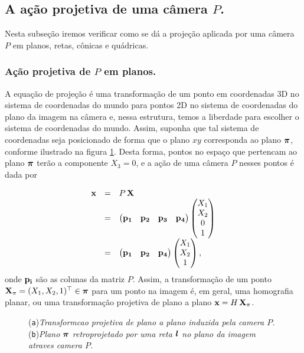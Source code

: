 \subsection{A ação projetiva de uma câmera $P$.}
Nesta subseção iremos verificar como se dá a projeção aplicada por uma câmera $P$ em planos, retas, cônicas e quádricas.


\subsubsection{Ação projetiva de $P$ em planos.}
A equação de projeção é uma transformação de um ponto em coordenadas 3D no sistema de coordenadas do mundo para pontos 2D no sistema de coordenadas do plano da imagem na câmera e, nessa estrutura, temos a liberdade para escolher o sistema de coordenadas do mundo. Assim, suponha que tal sistema de coordenadas seja posicionado de forma que o plano $xy$ corresponda ao plano $\boldsymbol{\pi}$, conforme ilustrado na figura \ref{fig.projecao-planos-retas}. Desta forma, pontos no espaço que pertencam ao plano $\boldsymbol{\pi}$ terão a componente $X_3=0$, e a ação de uma câmera $P$ nesses pontos é dada por

\begin{equation*}
\begin{array}{rcl}
\mathbf{x}&=&P\,\mathbf{X}\\
&=&
\begin{pmatrix}
{\bf p_1}&{\bf p_2}&{\bf p_3}&{\bf p_4}
\end{pmatrix}
\begin{pmatrix}
X_1\\
X_2\\
0\\
1
\end{pmatrix}\\
&=&
\begin{pmatrix}
{\bf p_1}&{\bf p_2}&{\bf p_4}
\end{pmatrix}
\begin{pmatrix}
X_1\\
X_2\\
1
\end{pmatrix},
\end{array}
\end{equation*}
onde ${\bf p_i}$ são as colunas da matriz $P$. Assim, a transformação de um ponto $\mathbf{X}_\pi=(X_1,X_2,1)^\top\in\boldsymbol{\pi}$ para um ponto na imagem é, em geral, uma homografia planar, ou uma transformação projetiva de plano a plano $\mathbf{x}=H\,\mathbf{X}_\pi$.


\begin{figure}[htb!]
\centering
{}
\quad
{}
\caption{({\tt a})\textit{Transformcao projetiva de plano a plano induzida pela camera $P$.}\,\,({\tt b})\textit{Plano $\boldsymbol{\pi}$ retroprojetado por uma reta $\boldsymbol{l}$ no plano da imagem atraves camera $P$.}}
\label{fig.projecao-planos-retas}
\end{figure}


